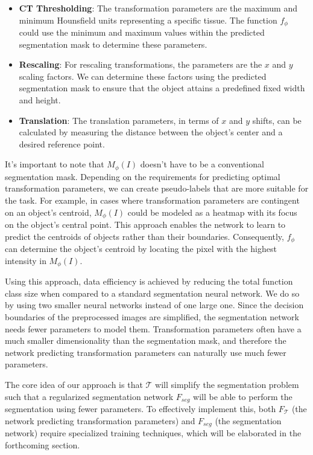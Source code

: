 \begin{itemize}
	\item \textbf{CT Thresholding}: The transformation parameters are the maximum and minimum Hounsfield units representing a specific tissue. The function \( f_\phi \) could use the minimum and maximum values within the predicted segmentation mask to determine these parameters.
	\item \textbf{Rescaling}: For rescaling transformations, the parameters are the \( x \) and \( y \) scaling factors. We can determine these factors using the predicted segmentation mask to ensure that the object attains a predefined fixed width and height.
	\item \textbf{Translation}: The translation parameters, in terms of \( x \) and \( y \) shifts, can be calculated by measuring the distance between the object's center and a desired reference point.
\end{itemize}

It's important to note that \( M_\phi(I) \) doesn't have to be a conventional segmentation mask. Depending on the requirements for predicting optimal transformation parameters, we can create pseudo-labels that are more suitable for the task. For example,
 in cases where transformation parameters are contingent on an object's centroid, \( M_\phi(I) \) could be modeled as a heatmap with its focus on the object's central point. This approach enables the network to learn to predict the centroids of objects rather than their boundaries. Consequently, \( f_\phi \) can determine the object's centroid by locating the pixel with the highest intensity in \( M_\phi(I) \).

Using this approach, data efficiency is achieved by reducing the total function class size when compared to a standard segmentation neural network. We do so by using two smaller neural networks instead of one large one. Since the decision boundaries of the preprocessed images are simplified, the segmentation network needs fewer parameters to model them. Transformation parameters often have a much smaller dimensionality than the segmentation mask, and therefore the network predicting transformation parameters can naturally use much fewer parameters.

The core idea of our approach is that $\mathcal{T}$ will simplify the segmentation problem such that a regularized segmentation network $F_{seg}$ will be able to perform the segmentation using fewer parameters. To effectively implement this, both \(F_{\mathcal{T}}\) (the network predicting transformation parameters) and \(F_{seg}\) (the segmentation network) require specialized training techniques, which will be elaborated in the forthcoming section.

